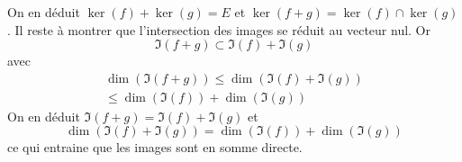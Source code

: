 On en déduit $\ker(f) + \ker(g) = E$ et $\ker(f+g) = \ker(f) \cap \ker(g)$. \newline
Il reste à montrer que l'intersection des images se réduit au vecteur nul. Or
\begin{displaymath}
  \Im(f+g) \subset \Im(f) + \Im(g)
\end{displaymath}
avec
\begin{multline*}
  \dim(\Im(f+g)) \leq \dim(\Im(f) + \Im(g)) \\
  \leq \dim(\Im(f)) + \dim(\Im(g))
\end{multline*}
On en déduit $\Im(f+g) = \Im(f) + \Im(g)$ et 
\begin{displaymath}
\dim(\Im(f) + \Im(g))
=\dim(\Im(f)) + \dim(\Im(g))
\end{displaymath}
ce qui entraine que les images sont en somme directe.
